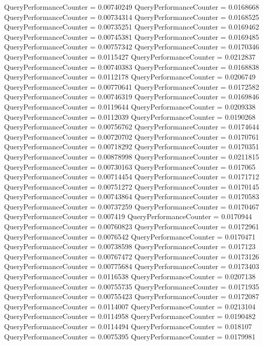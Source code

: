 \documentclass[9pt]{article}
\theoremstyle{plain}
\theoremstyle{definition}
\theoremstyle{remark}
\numberwithin{equation}{section}
\begin{document}
QueryPerformanceCounter  =  0.00740249
QueryPerformanceCounter  =  0.0168668
QueryPerformanceCounter  =  0.00734314
QueryPerformanceCounter  =  0.0168525
QueryPerformanceCounter  =  0.00735251
QueryPerformanceCounter  =  0.0169462
QueryPerformanceCounter  =  0.00745381
QueryPerformanceCounter  =  0.0169485
QueryPerformanceCounter  =  0.00757342
QueryPerformanceCounter  =  0.0170346
QueryPerformanceCounter  =  0.0115427
QueryPerformanceCounter  =  0.0212837
QueryPerformanceCounter  =  0.00740383
QueryPerformanceCounter  =  0.0168838
QueryPerformanceCounter  =  0.0112178
QueryPerformanceCounter  =  0.0206749
QueryPerformanceCounter  =  0.00770641
QueryPerformanceCounter  =  0.0172582
QueryPerformanceCounter  =  0.00746319
QueryPerformanceCounter  =  0.0169846
QueryPerformanceCounter  =  0.0119644
QueryPerformanceCounter  =  0.0209338
QueryPerformanceCounter  =  0.0112039
QueryPerformanceCounter  =  0.0190268
QueryPerformanceCounter  =  0.00756762
QueryPerformanceCounter  =  0.0174644
QueryPerformanceCounter  =  0.00720702
QueryPerformanceCounter  =  0.0170761
QueryPerformanceCounter  =  0.00718292
QueryPerformanceCounter  =  0.0170351
QueryPerformanceCounter  =  0.00878998
QueryPerformanceCounter  =  0.0211815
QueryPerformanceCounter  =  0.00730163
QueryPerformanceCounter  =  0.017065
QueryPerformanceCounter  =  0.00714454
QueryPerformanceCounter  =  0.0171712
QueryPerformanceCounter  =  0.00751272
QueryPerformanceCounter  =  0.0170145
QueryPerformanceCounter  =  0.00743864
QueryPerformanceCounter  =  0.0170583
QueryPerformanceCounter  =  0.00737259
QueryPerformanceCounter  =  0.0170467
QueryPerformanceCounter  =  0.007419
QueryPerformanceCounter  =  0.0170944
QueryPerformanceCounter  =  0.00760823
QueryPerformanceCounter  =  0.0172961
QueryPerformanceCounter  =  0.0076542
QueryPerformanceCounter  =  0.0170471
QueryPerformanceCounter  =  0.00738598
QueryPerformanceCounter  =  0.017123
QueryPerformanceCounter  =  0.00767472
QueryPerformanceCounter  =  0.0173126
QueryPerformanceCounter  =  0.00775684
QueryPerformanceCounter  =  0.0173403
QueryPerformanceCounter  =  0.0116538
QueryPerformanceCounter  =  0.0207138
QueryPerformanceCounter  =  0.00755735
QueryPerformanceCounter  =  0.0171935
QueryPerformanceCounter  =  0.00755423
QueryPerformanceCounter  =  0.0172087
QueryPerformanceCounter  =  0.0114007
QueryPerformanceCounter  =  0.0213104
QueryPerformanceCounter  =  0.0114958
QueryPerformanceCounter  =  0.0190482
QueryPerformanceCounter  =  0.0114494
QueryPerformanceCounter  =  0.018107
QueryPerformanceCounter  =  0.0075395
QueryPerformanceCounter  =  0.0179981
\end{document}
